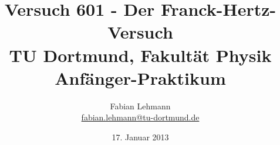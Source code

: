 

\renewcommand*\rmdefault{iwona}\normalfont\upshape


\title{Versuch 601 - Der Franck-Hertz-Versuch\\				%
\large TU Dortmund, Fakultät Physik\\ 
\normalsize Anfänger-Praktikum}


 \author{Fabian Lehmann\\					%
 {\small \href{fabian.lehmann@tu-dortmund.de}{fabian.lehmann@tu-dortmund.de}}		%
 }


\date{17. Januar 2013}%





\maketitle					%
\thispagestyle{empty} 				%



